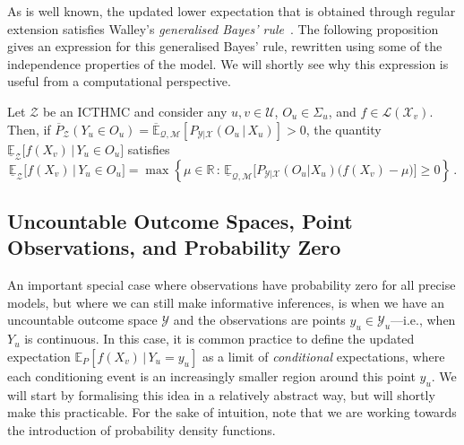 \documentclass[twoside,11pt]{article}
\newcommand{\reals}{\mathbb{R}}
\newcommand{\states}{\mathcal{X}}
\newcommand{\observs}{\mathcal{Y}}
\newcommand{\lexp}{\underline{\mathbb{E}}_{\rateset,\mathcal{M}}}
\newcommand{\uexp}{\overline{\mathbb{E}}_{\rateset,\mathcal{M}}}
\newcommand{\gambles}{\mathcal{L}}
\newcommand{\rateset}{\mathcal{Q}}
\begin{document}
As is well known, the updated lower expectation that is obtained through regular extension satisfies Walley's \emph{generalised Bayes' rule}~\citep{Walley:1991vk}. The following proposition gives an expression for this generalised Bayes' rule, rewritten using some of the independence properties of the model. We will shortly see why this expression is useful from a computational perspective.
\begin{proposition}\label{prop:GBR_regular}
Let $\mathcal{Z}$ be an ICTHMC and consider any $u,v\in\mathcal{U}$, $O_u\in\Sigma_u$, and $f\in\gambles(\states_v)$. Then, if $\overline{P}_\mathcal{Z}(Y_u\in O_u) = \uexp[P_{\observs\vert\states}(O_u\,\vert\,X_u)] > 0$, the quantity $\underline{\mathbb{E}}_{\mathcal{Z}}\bigl[f(X_v)\,\vert\,Y_u\in O_u\bigr]$ satisfies
\begin{equation*}
\underline{\mathbb{E}}_{\mathcal{Z}}\bigl[f(X_v)\,\vert\,Y_u\in O_u\bigr] = \max\left\{\mu\in\reals\,:\, \lexp\bigl[P_{\observs\vert\states}(O_u\vert X_u)\bigl(f(X_v) - \mu\bigr)\bigr] \geq 0\right\}\,.
\end{equation*}
\end{proposition}

\subsection{Uncountable Outcome Spaces, Point Observations, and Probability Zero}\label{subsec:uncountable}

An important special case where observations have probability zero for all precise models, but where we can still make informative inferences, is when we have an uncountable outcome space $\observs$ and the observations are points $y_u\in\observs_u$---i.e., when $Y_u$ is continuous. In this case, it is common practice to define the updated expectation $\mathbb{E}_P[f(X_v)\,\vert\,Y_u=y_u]$ as a limit of \emph{conditional} expectations, where each conditioning event is an increasingly smaller region around this point $y_u$. We will start by formalising this idea in a relatively abstract way, but will shortly make this practicable. For the sake of intuition, note that we are working towards the introduction of probability density functions.
\end{document}
